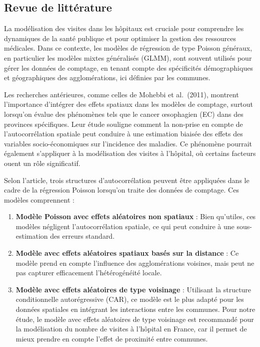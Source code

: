 \documentclass[
]{article}
\begin{document}
\subsection{Revue de littérature}\label{revue-de-littuxe9rature}

La modélisation des visites dans les hôpitaux est cruciale pour
comprendre les dynamiques de la santé publique et pour optimiser la
gestion des ressources médicales. Dans ce contexte, les modèles de
régression de type Poisson généraux, en particulier les modèles mixtes
généralisés (GLMM), sont souvent utilisés pour gérer les données de
comptage, en tenant compte des spécificités démographiques et
géographiques des agglomérations, ici définies par les communes.

Les recherches antérieures, comme celles de Mohebbi et al.~(2011),
montrent l'importance d'intégrer des effets spatiaux dans les modèles de
comptage, surtout lorsqu'on évalue des phénomènes tels que le cancer
œsophagien (EC) dans des provinces spécifiques. Leur étude souligne
comment la non-prise en compte de l'autocorrélation spatiale peut
conduire à une estimation biaisée des effets des variables
socio-économiques sur l'incidence des maladies. Ce phénomène pourrait
également s'appliquer à la modélisation des visites à l'hôpital, où
certains facteurs ouent un rôle significatif.

Selon l'article, trois structures d'autocorrélation peuvent être
appliquées dans le cadre de la régression Poisson lorsqu'on traite des
données de comptage. Ces modèles comprennent :

\begin{enumerate}
\def\labelenumi{\arabic{enumi}.}
\item
  \textbf{Modèle Poisson avec effets aléatoires non spatiaux} : Bien
  qu'utiles, ces modèles négligent l'autocorrélation spatiale, ce qui
  peut conduire à une sous-estimation des erreurs standard.
\item
  \textbf{Modèle avec effets aléatoires spatiaux basés sur la distance}
  : Ce modèle prend en compte l'influence des agglomérations voisines,
  mais peut ne pas capturer efficacement l'hétérogénéité locale.
\item
  \textbf{Modèle avec effets aléatoires de type voisinage} : Utilisant
  la structure conditionnelle autorégressive (CAR), ce modèle est le
  plus adapté pour les données spatiales en intégrant les interactions
  entre les communes. Pour notre étude, le modèle avec effets aléatoires
  de type voisinage est recommandé pour la modélisation du nombre de
  visites à l'hôpital en France, car il permet de mieux prendre en
  compte l'effet de proximité entre communes.
\end{enumerate}
\end{document}
